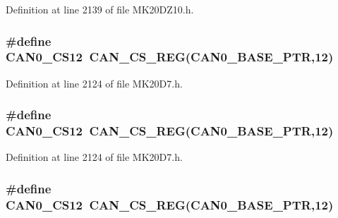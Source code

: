 Definition at line 2139 of file M\+K20\+D\+Z10.\+h.

\subsubsection[{\texorpdfstring{C\+A\+N0\+\_\+\+C\+S12}{CAN0_CS12}}]{\setlength{\rightskip}{0pt plus 5cm}\#define C\+A\+N0\+\_\+\+C\+S12~{\bf C\+A\+N\+\_\+\+C\+S\+\_\+\+R\+EG}({\bf C\+A\+N0\+\_\+\+B\+A\+S\+E\+\_\+\+P\+TR},12)}\hypertarget{group___c_a_n___register___accessor___macros_ga9bab0d0b9bdb8cc7f7c2acb034b80b4d}{}\label{group___c_a_n___register___accessor___macros_ga9bab0d0b9bdb8cc7f7c2acb034b80b4d}


Definition at line 2124 of file M\+K20\+D7.\+h.

\subsubsection[{\texorpdfstring{C\+A\+N0\+\_\+\+C\+S12}{CAN0_CS12}}]{\setlength{\rightskip}{0pt plus 5cm}\#define C\+A\+N0\+\_\+\+C\+S12~{\bf C\+A\+N\+\_\+\+C\+S\+\_\+\+R\+EG}({\bf C\+A\+N0\+\_\+\+B\+A\+S\+E\+\_\+\+P\+TR},12)}\hypertarget{group___c_a_n___register___accessor___macros_ga9bab0d0b9bdb8cc7f7c2acb034b80b4d}{}\label{group___c_a_n___register___accessor___macros_ga9bab0d0b9bdb8cc7f7c2acb034b80b4d}


Definition at line 2124 of file M\+K20\+D7.\+h.

\subsubsection[{\texorpdfstring{C\+A\+N0\+\_\+\+C\+S12}{CAN0_CS12}}]{\setlength{\rightskip}{0pt plus 5cm}\#define C\+A\+N0\+\_\+\+C\+S12~{\bf C\+A\+N\+\_\+\+C\+S\+\_\+\+R\+EG}({\bf C\+A\+N0\+\_\+\+B\+A\+S\+E\+\_\+\+P\+TR},12)}\hypertarget{group___c_a_n___register___accessor___macros_ga9bab0d0b9bdb8cc7f7c2acb034b80b4d}{}\label{group___c_a_n___register___accessor___macros_ga9bab0d0b9bdb8cc7f7c2acb034b80b4d}


